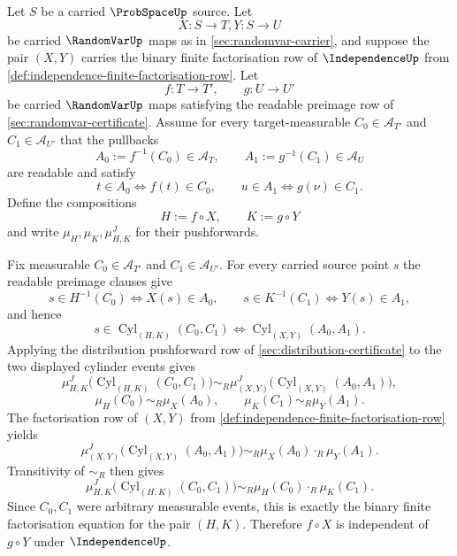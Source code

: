 \begin{theorem}
\label{thm:independence-measurable-image-bridge}
Let $S$ be a carried $\ProbSpaceUp$ source.
Let
$$
X:S\to T,
Y:S\to U
$$
be carried $\RandomVarUp$ maps as in \autoref{sec:randomvar-carrier}, and suppose the pair $(X,Y)$ carries the binary finite factorisation row of $\IndependenceUp$ from \autoref{def:independence-finite-factorisation-row}.
Let
$$
f:T\to T',\qquad g:U\to U'$$
be carried $\RandomVarUp$ maps satisfying the readable preimage row of \autoref{sec:randomvar-certificate}.
Assume for every target-measurable $C_0\in\mathcal A_{T'}$ and $C_1\in\mathcal A_{U'}$ that the pullbacks
$$
A_0:=f^{-1}(C_0)\in\mathcal A_T,\qquad
A_1:=g^{-1}(C_1)\in\mathcal A_U
$$
are readable and satisfy
$$
t\in A_0\Longleftrightarrow f(t)\in C_0,
\qquad
u\in A_1\Longleftrightarrow g(\nu)\in C_1.
$$
Define the compositions
$$
H:=f\circ X,\qquad K:=g\circ Y
$$
and write $\mu_H,\mu_K,\mu_{H,K}^J$ for their pushforwards.

Fix measurable $C_0\in\mathcal A_{T'}$ and $C_1\in\mathcal A_{U'}$.
For every carried source point $s$ the readable preimage clauses give
$$
s\in H^{-1}(C_0)\Longleftrightarrow X(s)\in A_0,
\qquad
s\in K^{-1}(C_1)\Longleftrightarrow Y(s)\in A_1,
$$
and hence
$$
s\in \operatorname{Cyl}_{(H,K)}(C_0,C_1)
\Longleftrightarrow
\operatorname{Cyl}_{(X,Y)}(A_0,A_1).
$$
Applying the distribution pushforward row of \autoref{sec:distribution-certificate} to the two displayed cylinder events gives
$$
\mu_{H,K}^J\bigl(\operatorname{Cyl}_{(H,K)}(C_0,C_1)\bigr)\sim_R
\mu_{(X,Y)}^J\bigl(\operatorname{Cyl}_{(X,Y)}(A_0,A_1)\bigr),
$$
$$
\mu_H(C_0)\sim_R\mu_X(A_0),\qquad
\mu_K(C_1)\sim_R\mu_Y(A_1).
$$
The factorisation row of $(X,Y)$ from \autoref{def:independence-finite-factorisation-row} yields
$$
\mu_{(X,Y)}^J\bigl(\operatorname{Cyl}_{(X,Y)}(A_0,A_1)\bigr)\sim_R
\mu_X(A_0)\cdot_R\mu_Y(A_1).
$$
Transitivity of $\sim_R$ then gives
$$
\mu_{H,K}^J\bigl(\operatorname{Cyl}_{(H,K)}(C_0,C_1)\bigr)
\sim_R
\mu_H(C_0)\cdot_R\mu_K(C_1).
$$
Since $C_0,C_1$ were arbitrary measurable events, this is exactly the binary finite factorisation equation for the pair $(H,K)$. Therefore $f\circ X$ is independent of $g\circ Y$ under $\IndependenceUp$.
\end{theorem}

